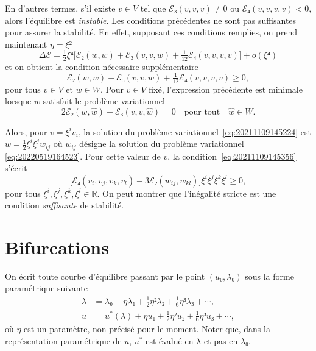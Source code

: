 \documentclass[12pt, final]{scrartcl}
\theoremstyle{definition}
\newcommand{\reals}{\mathbb{R}}
\begin{document}
En d'autres termes, s'il existe \(v∈V\) tel que \(ℰ₃(v, v, v) \neq 0\) ou
\(ℰ₄(v, v, v, v) < 0\), alors l'équilibre est \emph{instable}. Les conditions
précédentes ne sont pas suffisantes pour assurer la stabilité. En effet,
supposant ces conditions remplies, on prend maintenant \(η = ξ²\)
\begin{equation}
  Δℰ = \tfrac{1}{2} ξ⁴ \bigl[ ℰ₂(w, w) + ℰ₃(v, v, w) + \tfrac{1}{12} ℰ₄(v, v, v, v) \bigr] + o(ξ⁴)
\end{equation}
et on obtient la condition nécessaire supplémentaire
\begin{equation}
  \label{eq:20211109145356}
  ℰ₂(w, w) + ℰ₃(v, v, w) + \tfrac{1}{12} ℰ₄(v, v, v, v) \geq 0,
\end{equation}
pour tous \(v∈V\) et \(w∈W\). Pour \(v∈V\) fixé, l'expression précédente est
minimale lorsque \(w\) satisfait le problème variationnel
\begin{equation}
  \label{eq:20211109145224}
  2ℰ₂(w, \hat{w}) +ℰ₃(v, v, \hat{w}) = 0 \quad \text{pour tout} \quad \hat{w}∈W.
\end{equation}

Alors, pour \(v = ξ^i v_i\), la solution du problème
variationnel~\eqref{eq:20211109145224} est \(w = \tfrac{1}{2} ξ^i ξ^j w_{ij}\)
où \(w_{ij}\) désigne la solution du problème variationnel
\eqref{eq:20220519164523}. Pour cette valeur de \(v\), la
condition~\eqref{eq:20211109145356} s'écrit
\begin{equation}
  \bigl[ℰ₄(v_i, v_j, v_k, v_l) - 3ℰ₂(w_{ij}, w_{kl})\bigr] ξ^i ξ^j ξ^k ξ^l \geq 0,
\end{equation}
pour tous \(ξ^i, ξ^j, ξ^k, ξ^l∈\reals\). On peut montrer que l'inégalité stricte
est une condition \emph{suffisante} de
stabilité. 

\section{Bifurcations}
\label{sec:20220617075558}

On écrit toute courbe d'équilibre passant par le point \((u₀, λ₀)\) sous la
forme paramétrique suivante
\begin{align}
  \label{eq:20211115075817}
  λ &=  λ₀ + η λ₁ + \tfrac{1}{2} η² λ₂ + \tfrac{1}{6} η³ λ₃ + \cdots,\\
  \label{eq:20211115075835}
  u &= u^{\ast}(λ) + η u₁ + \tfrac{1}{2} η² u₂ + \tfrac{1}{6} η³ u₃ + \cdots,
\end{align}
où \(η\) est un paramètre, non précisé pour le moment. Noter que, dans la
représentation paramétrique de \(u\), \(u^{\ast}\) est évalué en \(λ\) et pas en
\(λ₀\).
\end{document}
